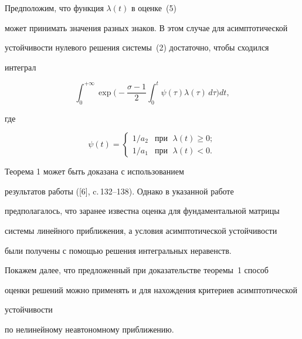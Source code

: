 \begin{note}


Предположим, что функция $\lambda(t)$ в оценке~(5)


может принимать значения разных знаков. В этом случае для асимптотической


устойчивости нулевого решения системы~(2) достаточно, чтобы сходился


интеграл


$$


\int_0^{+\infty} \exp \bigg(-\frac{\sigma-1}{2} \int_0^{t} \psi(\tau)


\lambda(\tau)\,d\tau \bigg) dt,


$$


где


$$


\psi(t)=


\begin{cases}


1/a_2 & \text{при } \; \lambda(t)\geq 0; \\


1/a_1 & \text{при } \; \lambda(t)< 0.


\end{cases}


$$


\end{note}





\begin{note}


Теорема 1 может быть доказана с использованием


результатов работы ([6], c.\,132--138). Однако в указанной работе


предполагалось, что заранее известна оценка для фундаментальной матрицы


системы линейного приближения, а условия асимптотической устойчивости


были получены с помощью решения интегральных неравенств.


\end{note}





Покажем далее, что предложенный при доказательстве теоремы~1 способ


оценки решений можно применять и для нахождения критериев асимптотической


устойчивости


по нелинейному неавтономному приближению.


